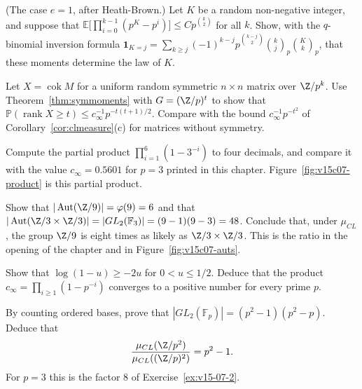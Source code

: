 \begin{exercise}[$\star\star$]\label{ex:hbuniq}
(The case $e=1$, after Heath-Brown.) Let $K$ be a random non-negative integer, and suppose that $\mathbb E\bigl[\prod_{i=0}^{k-1}(p^K-p^i)\bigr]\le Cp^{\binom k2}$ for all $k$. Show, with the $q$-binomial inversion formula $\mathbf 1_{K=j}=\sum_{k\ge j}(-1)^{k-j}p^{\binom{k-j}2}\binom kj_p\binom Kk_p$, that these moments determine the law of $K$.
\end{exercise}

\begin{exercise}[$\star\star$]\label{ex:symrank}
Let $X=\operatorname{cok}M$ for a uniform random symmetric $n\times n$ matrix over $\Z/p^k$. Use Theorem~\ref{thm:symmoments} with $G=(\Z/p)^t$ to show that $\mathbb P(\operatorname{rank}X\ge t)\le c_\infty^{-1}p^{-t(t+1)/2}$. Compare with the bound $c_\infty^{-1}p^{-t^2}$ of Corollary~\ref{cor:clmeasure}(c) for matrices without symmetry.
\end{exercise}

\begin{exercise}[$\star$]\label{ex:v15-07-1}
Compute the partial product \(\prod_{i=1}^{6}(1-3^{-i})\) to four decimals, and compare it with the value \(c_\infty=0.5601\) for \(p=3\) printed in this chapter. Figure~\ref{fig:v15c07-product} is this partial product.
\end{exercise}

\begin{exercise}[$\star$]\label{ex:v15-07-2}
Show that \(|\operatorname{Aut}(\Z/9)|=\varphi(9)=6\) and that \(|\operatorname{Aut}(\Z/3\times\Z/3)|=|GL_2(\mathbb F_3)|=(9-1)(9-3)=48\). Conclude that, under \(\mu_{CL}\), the group \(\Z/9\) is eight times as likely as \(\Z/3\times\Z/3\). This is the ratio in the opening of the chapter and in Figure~\ref{fig:v15c07-auts}.
\end{exercise}

\begin{exercise}[$\star\star$]\label{ex:v15-07-3}
Show that \(\log(1-u)\ge-2u\) for \(0<u\le1/2\). Deduce that the product \(c_\infty=\prod_{i\ge1}(1-p^{-i})\) converges to a positive number for every prime \(p\).
\end{exercise}

\begin{exercise}[$\star\star\star$]\label{ex:v15-07-4}
By counting ordered bases, prove that \(|GL_2(\mathbb F_p)|=(p^2-1)(p^2-p)\). Deduce that
\[
\frac{\mu_{CL}(\Z/p^2)}{\mu_{CL}((\Z/p)^2)}=p^2-1.
\]
For \(p=3\) this is the factor \(8\) of Exercise~\ref{ex:v15-07-2}.
\end{exercise}

